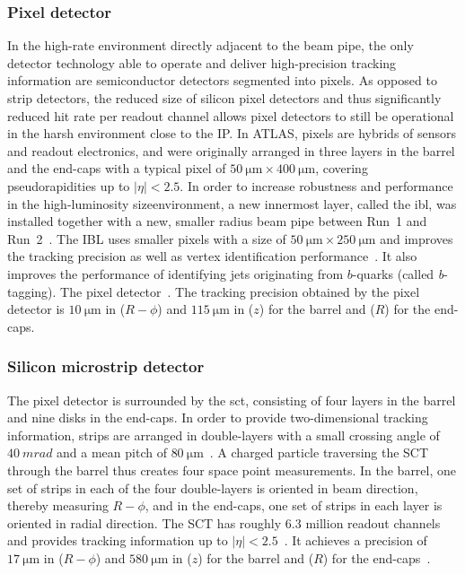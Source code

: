 \subsubsection{Pixel detector}

In the high-rate environment directly adjacent to the beam pipe, the only detector technology able to operate and deliver high-precision tracking information are semiconductor detectors segmented into pixels. As opposed to strip detectors, the reduced size of silicon pixel detectors and thus significantly reduced hit rate per readout channel allows pixel detectors to still be operational in the harsh environment close to the IP. In ATLAS, pixels are hybrids of sensors and readout electronics, and were originally arranged in three layers in the barrel and the end-caps with a typical pixel of $\SI{50}{\micro\meter}\times \SI{400}{\micro\meter}$, covering pseudorapidities up to $\vert\eta\vert < 2.5$. In order to increase robustness  and performance in the high-luminosity sizeenvironment, a new innermost layer, called the \gls{ibl}, was installed together with a new, smaller radius beam pipe between Run~1 and Run~2~\cite{Abbott:2018ikt,Capeans:1291633}. The IBL uses smaller pixels with a size of $\SI{50}{\micro\meter}\times \SI{250}{\micro\meter}$ and improves the tracking precision as well as vertex identification performance~\cite{Capeans:1291633}. It also improves the performance of identifying jets originating from $b$-quarks (called \textit{b}-tagging). The pixel detector~\cite{Aad:2019aic}. The tracking precision obtained by the pixel detector is $\SI{10}{\micro\meter}$ in ($R-\phi$) and $\SI{115}{\micro\meter}$ in ($z$) for the barrel and ($R$) for the end-caps.

\subsubsection{Silicon microstrip detector}

The pixel detector is surrounded by the \gls{sct}, consisting of four layers in the barrel and nine disks in the end-caps. In order to provide two-dimensional tracking information, strips are arranged in double-layers with a small crossing angle of $\SI{40}{mrad}$ and a mean pitch of $\SI{80}{\micro\meter}$~\cite{Aad:2008zzm}. A charged particle traversing the SCT through the barrel thus creates four space point measurements. In the barrel, one set of strips in each of the four double-layers is oriented in beam direction, thereby measuring $R-\phi$, and in the end-caps, one set of strips in each layer is oriented in radial direction. The SCT has roughly $6.3$ million readout channels and provides tracking information up to $\vert\eta\vert <2.5$~\cite{Aad:2008zzm}. It achieves a precision of $\SI{17}{\micro\meter}$ in ($R-\phi$) and $\SI{580}{\micro\meter}$ in ($z$) for the barrel and ($R$) for the end-caps~\cite{Aad:2008zzm}.

